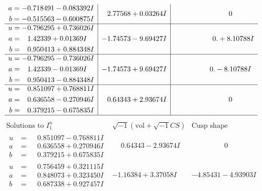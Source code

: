 \documentclass[1p]{elsarticle_modified}
\theoremstyle{definition}
\newcommand{\I}{\sqrt{-1}}
\begin{document}
$$\begin{array}{c|c|c}
\begin{aligned}
a &= -0.718491 - 0.083392 I \\
b &= -0.515563 - 0.600875 I\end{aligned}
 & \phantom{-}2.77568 + 0.03264 I & \phantom{-0.000000 } 0 \\ \hline\begin{aligned}
u &= -0.796295 + 0.736026 I \\
a &= \phantom{-}1.42339 + 0.01369 I \\
b &= \phantom{-}0.950413 + 0.884348 I\end{aligned}
 & -1.74573 - 9.69427 I & \phantom{-0.000000 -}0. + 8.10788 I \\ \hline\begin{aligned}
u &= -0.796295 - 0.736026 I \\
a &= \phantom{-}1.42339 - 0.01369 I \\
b &= \phantom{-}0.950413 - 0.884348 I\end{aligned}
 & -1.74573 + 9.69427 I & \phantom{-0.000000 } 0. - 8.10788 I \\ \hline\begin{aligned}
u &= \phantom{-}0.851097 + 0.768811 I \\
a &= \phantom{-}0.636558 - 0.270946 I \\
b &= \phantom{-}0.379215 - 0.675835 I\end{aligned}
 & \phantom{-}0.64343 + 2.93674 I & \phantom{-0.000000 } 0\\
 \hline 
 \end{array}$$\newpage$$\begin{array}{c|c|c}  
\text{Solutions to }I^u_{1}& \I (\text{vol} + \sqrt{-1}CS) & \text{Cusp shape}\\
 \hline 
\begin{aligned}
u &= \phantom{-}0.851097 - 0.768811 I \\
a &= \phantom{-}0.636558 + 0.270946 I \\
b &= \phantom{-}0.379215 + 0.675835 I\end{aligned}
 & \phantom{-}0.64343 - 2.93674 I & \phantom{-0.000000 } 0 \\ \hline\begin{aligned}
u &= \phantom{-}0.756459 + 0.321115 I \\
a &= \phantom{-}0.848073 + 0.323450 I \\
b &= \phantom{-}0.687338 + 0.927457 I\end{aligned}
 & -1.16384 + 3.37058 I & -4.85431 - 4.93903 I \\ \hline\begin{aligned}

\end{aligned}
\end{array}$$
\end{document}
